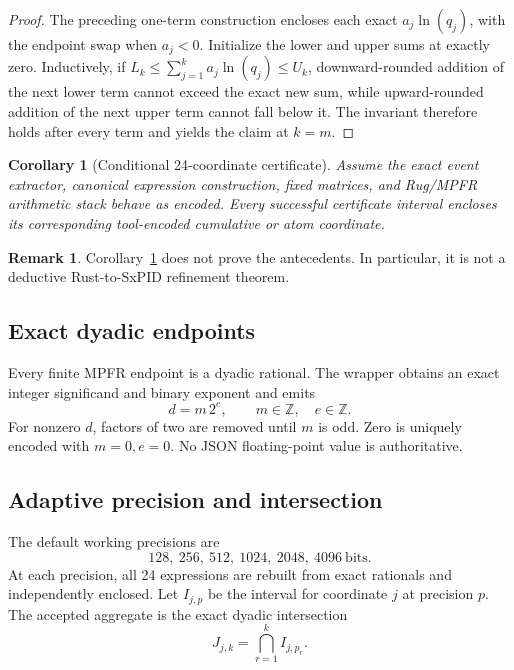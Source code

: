 \documentclass[11pt]{article}
\newtheorem{corollary}[theorem]{Corollary}
\theoremstyle{definition}
\newtheorem{remark}[theorem]{Remark}
\begin{document}
\begin{proof}
The preceding one-term construction encloses each exact $a_j\ln(q_j)$, with the endpoint swap
when $a_j<0$.  Initialize the lower and upper sums at exactly zero.  Inductively, if
$L_k\le\sum_{j=1}^{k}a_j\ln(q_j)\le U_k$, downward-rounded addition of the next lower term cannot
exceed the exact new sum, while upward-rounded addition of the next upper term cannot fall below
it.  The invariant therefore holds after every term and yields the claim at $k=m$.
\end{proof}

\begin{corollary}[Conditional 24-coordinate certificate]\label{cor:24}
Assume the exact event extractor, canonical expression construction, fixed matrices, and
Rug/MPFR arithmetic stack behave as encoded.  Every successful certificate interval encloses its
corresponding tool-encoded cumulative or atom coordinate.
\end{corollary}

\begin{remark}
Corollary~\ref{cor:24} does not prove the antecedents.  In particular, it is not a deductive
Rust-to-SxPID refinement theorem.
\end{remark}

\subsection{Exact dyadic endpoints}

Every finite MPFR endpoint is a dyadic rational.  The wrapper obtains an exact integer
significand and binary exponent and emits
\begin{equation}
  d=m\,2^e,
  \qquad
  m\in\mathbb{Z},
  \quad
  e\in\mathbb{Z}.
\end{equation}
For nonzero $d$, factors of two are removed until $m$ is odd.  Zero is uniquely encoded with
$m=0,e=0$.  No JSON floating-point value is authoritative.

\subsection{Adaptive precision and intersection}

The default working precisions are
\begin{equation}
  128,\ 256,\ 512,\ 1024,\ 2048,\ 4096\ \text{bits}.
\end{equation}
At each precision, all 24 expressions are rebuilt from exact rationals and independently
enclosed.  Let $I_{j,p}$ be the interval for coordinate $j$ at precision $p$.  The accepted
aggregate is the exact dyadic intersection
\begin{equation}
  J_{j,k}=\bigcap_{r=1}^{k}I_{j,p_r}.
\end{equation}
\end{document}
